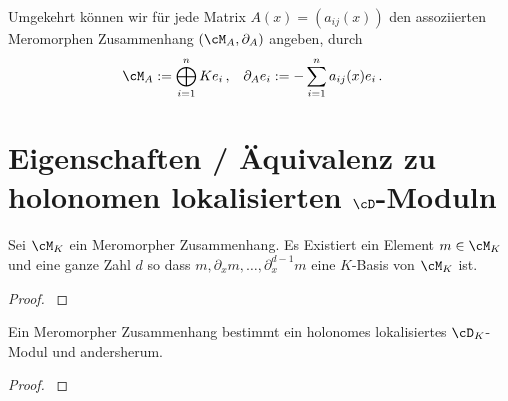 Umgekehrt können wir für jede Matrix $A(x)=(a_{ij}(x))$ den
assoziierten Meromorphen Zusammenhang $(\cM_A,\partial_A)$ %
angeben, durch
\begin{align*}
\cM_A & :=\bigoplus_{i=1}^n Ke_i \,, & \partial_A e_i &:=
-\sum_{i=1}^na_{ij}(x)e_i \,.
\end{align*}

\section{Eigenschaften / Äquivalenz zu holonomen lokalisierten $\cD$-Moduln}
\begin{comment}
\cite[4.2]{sabbah_cimpa90}
Let $\cM$ be a left $\cD$-module. First we consider it only as a
$\C\{x\}$-module and let $\cM[x^{-1}]$ be the localized module.
\end{comment}

\begin{lem} \label{lem:Zyklischer-Vektor}
\cite[Thm 4.3.3]{sabbah_cimpa90}
\cite[Satz 4.8]{ZulaBarbara}
Sei $\cM_K$ ein Meromorpher Zusammenhang. Es Existiert ein Element
$m\in\cM_K$ und eine ganze Zahl $d$ so dass
$m,\partial_xm,\dots,\partial_x^{d-1}m$ eine $K$-Basis von $\cM_K$ ist.
\end{lem}
\begin{proof}
\cite[Satz 4.8]{ZulaBarbara}
\end{proof}
\begin{comment}
TODO: Wie findet man einen Zyklischen Vektor\\
TODO: wie bekommt man daraus das $P$
\end{comment}

\begin{thm}
\cite[Thm 4.3.2]{sabbah_cimpa90}
Ein Meromorpher Zusammenhang bestimmt ein holonomes lokalisiertes $\cD_K$-Modul
und andersherum.
\end{thm}
\begin{proof}
\cite[Thm 4.3.2]{sabbah_cimpa90}
\end{proof}

